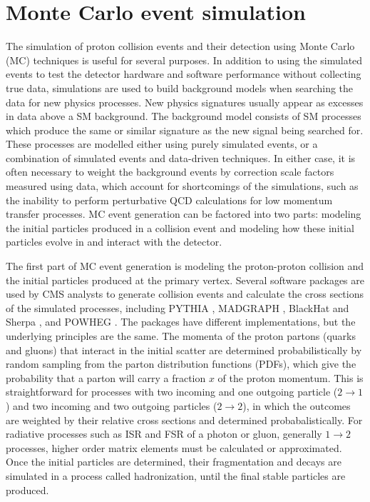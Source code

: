 \section{Monte Carlo event simulation}

The simulation of proton collision events and their detection using Monte Carlo (MC) techniques is useful for several purposes. In addition to using the simulated events to test the detector hardware and software performance without collecting true data, simulations are used to build background models when searching the data for new physics processes. New physics signatures usually appear as excesses in data above a SM background. The background model consists of SM processes which produce the same or similar signature as the new signal being searched for. These processes are modelled either using purely simulated events, or a combination of simulated events and data-driven techniques. In either case, it is often necessary to weight the background events by correction scale factors measured using data, which account for shortcomings of the simulations, such as the inability to perform perturbative QCD calculations for low momentum transfer processes. MC event generation can be factored into two parts: modeling the initial particles produced in a collision event and modeling how these initial particles evolve in and interact with the detector.

\indent The first part of MC event generation is modeling the proton-proton collision and the initial particles produced at the primary vertex. Several software packages are used by CMS analysts to generate collision events and calculate the cross sections of the simulated processes, including PYTHIA \cite{1126-6708-2006-05-026}, MADGRAPH \cite{Alwall2011}, BlackHat and Sherpa \cite{Berger:2009ba}, and POWHEG \cite{Alioli:2010ab}. The packages have different implementations, but the underlying principles are the same. The momenta of the proton partons (quarks and gluons) that interact in the initial scatter are determined probabilistically by random sampling from the parton distribution functions (PDFs), which give the probability that a parton will carry a fraction $x$ of the proton momentum. This is straightforward for processes with two incoming and one outgoing particle ($2 \rightarrow 1$) and two incoming and two outgoing particles ($2 \rightarrow 2$), in which the outcomes are weighted by their relative cross sections and determined probabalistically. For radiative processes such as ISR and FSR of a photon or gluon, generally $1 \rightarrow 2$ processes, higher order matrix elements must be calculated or approximated. Once the initial particles are determined, their fragmentation and decays are simulated in a process called hadronization, until the final stable particles are produced. 


